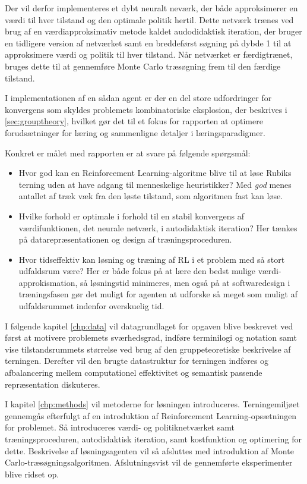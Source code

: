 \documentclass[../main.tex]{subfiles}
\begin{document}
Der vil derfor implementeres et dybt neuralt neværk, der både approksimerer en værdi til hver tilstand og den optimale politik hertil. Dette netværk trænes ved brug af en værdiapproksimativ metode kaldet audodidaktisk iteration, der bruger en tidligere version af netværket samt en breddeførst søgning på dybde 1 til at approksimere værdi og politik til hver tilstand.
Når netværket er færdigtrænet, bruges dette til at gennemføre Monte Carlo træsøgning frem til den færdige tilstand. 

I implementationen af en sådan agent er der en del store udfordringer for konvergens som skyldes problemets kombinatoriske eksplosion, der beskrives i \ref{sec:grouptheory}, hvilket gør det til et fokus for rapporten at optimere forudsætninger for læring og sammenligne detaljer i læringsparadigmer.


Konkret er målet med rapporten er at svare på følgende spørgsmål:
\begin{itemize}
	\item Hvor god kan en Reinforcement Learning-algoritme blive til at løse Rubiks terning uden at have adgang til menneskelige heuristikker? Med \textit{god} menes antallet af træk væk fra den løste tilstand, som algoritmen fast kan løse.
	\item Hvilke forhold er optimale i forhold til en stabil konvergens af værdifunktionen, det neurale netværk, i autodidaktisk iteration? Her tænkes på datarepræsentationen og design af træningsproceduren.
	\item Hvor tidseffektiv kan løsning og træning af RL i et problem med så stort udfaldsrum være? Her er både fokus på  at lære den bedst mulige værdi-approkismation, så løsningstid minimeres, men også på at softwaredesign i træningsfasen gør det muligt for agenten at udforske så meget som muligt af udfaldsrummet indenfor overskuelig tid.
\end{itemize}
\noindent
I følgende kapitel \eqref{chp:data} vil datagrundlaget for opgaven blive beskrevet ved først at motivere problemets sværhedsgrad, indføre terminilogi og notation samt vise tilstandsrummets størrelse ved brug af den gruppeteoretiske beskrivelse af terningen. Derefter vil den brugte datastruktur for terningen indføres og afbalancering mellem computationel effektivitet og semantisk passende repræsentation diskuteres.

I kapitel \ref{chp:methods} vil metoderne for løsningen introduceres. Terningemiljøet gennemgås efterfulgt af en introduktion af Reinforcement Learning-opsætningen for problemet. Så introduceres værdi- og politiknetværket samt træningsproceduren, autodidaktisk iteration, samt kostfunktion og optimering for dette. Beskrivelse af løsningsagenten vil så afsluttes med introduktion af Monte Carlo-træsøgningsalgoritmen. Afslutningsvist  vil de gennemførte eksperimenter blive ridset op.



 
\end{document}
